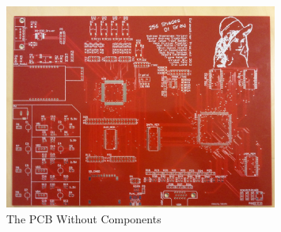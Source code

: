 \begin{figure}[h]
  \centering
  \includegraphics[width=0.8\textwidth]{fig/pcb/pcbwithoutcomp.jpg}
  \caption{The PCB Without Components}
  \label{fig:pcb-without-components}
\end{figure}
